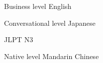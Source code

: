 

\begin{cventries}

  \cventry
    {Business level} %
    {English} %
    {} %
    {} %
    {
      \begin{cvitems} %
      \end{cvitems}
    }

  \cventry
    {Conversational level} %
    {Japanese} %
    {} %
    {} %
    {
      \begin{cvitems} %
        \item {JLPT N3}
      \end{cvitems}
    }

  \cventry
  {Native level} %
  {Mandarin Chinese} %
  {} %
  {} %
  {
    \begin{cvitems} %
    \end{cvitems}
  }

\end{cventries}
